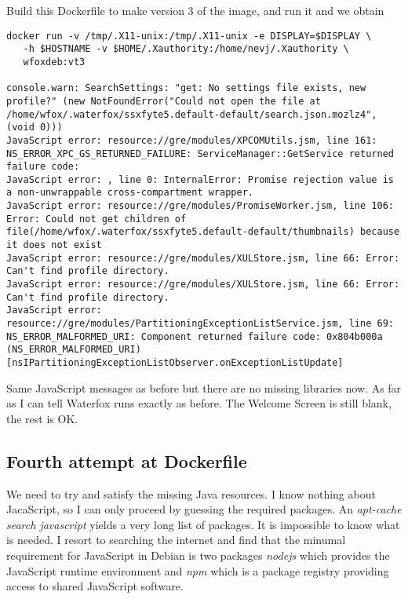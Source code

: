 \documentclass[a4paper]{article}  %
\begin{document}
Build this Dockerfile to make version 3 of the image, and run it and we obtain
\begin{tcolorbox}
\begin{verbatim}
docker run -v /tmp/.X11-unix:/tmp/.X11-unix -e DISPLAY=$DISPLAY \
   -h $HOSTNAME -v $HOME/.Xauthority:/home/nevj/.Xauthority \
   wfoxdeb:vt3

console.warn: SearchSettings: "get: No settings file exists, new profile?" (new NotFoundError("Could not open the file at /home/wfox/.waterfox/ssxfyte5.default-default/search.json.mozlz4", (void 0)))
JavaScript error: resource://gre/modules/XPCOMUtils.jsm, line 161: NS_ERROR_XPC_GS_RETURNED_FAILURE: ServiceManager::GetService returned failure code:
JavaScript error: , line 0: InternalError: Promise rejection value is a non-unwrappable cross-compartment wrapper.
JavaScript error: resource://gre/modules/PromiseWorker.jsm, line 106: Error: Could not get children of file(/home/wfox/.waterfox/ssxfyte5.default-default/thumbnails) because it does not exist
JavaScript error: resource://gre/modules/XULStore.jsm, line 66: Error: Can't find profile directory.
JavaScript error: resource://gre/modules/XULStore.jsm, line 66: Error: Can't find profile directory.
JavaScript error: resource://gre/modules/PartitioningExceptionListService.jsm, line 69: NS_ERROR_MALFORMED_URI: Component returned failure code: 0x804b000a (NS_ERROR_MALFORMED_URI) [nsIPartitioningExceptionListObserver.onExceptionListUpdate]
\end{verbatim}
\end{tcolorbox}

Same JavaScript messages as before but there are no missing libraries now.  As far as I can tell Waterfox runs exactly as before.   The Welcome Screen is still blank, the rest is OK.

\subsection{Fourth attempt at Dockerfile}
 We need to try and satisfy the missing Java resources. I know nothing about JacaScript, so I can only proceed by guessing the required packages. 
An {\em apt-cache search javascript} yields a very long list of packages. It is impossible to know what is needed.  I resort to searching the internet and find that the minumal requirement for JavaScript in Debian is two packages {\em nodejs} which provides the JavaScript runtime environment and {\em npm} which is a package registry providing access to shared JavaScript software. 
\end{document}
